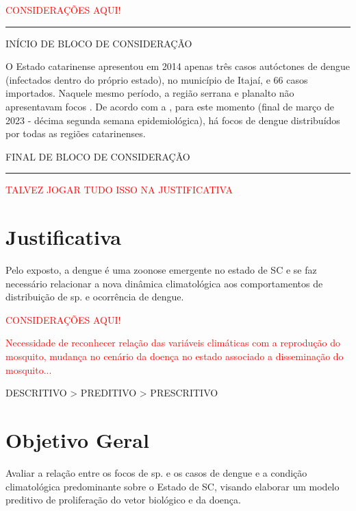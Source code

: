 \newpage

\begin{center}
\textcolor{red}{CONSIDERAÇÕES AQUI!}
\end{center}

{\color{red} \rule{\linewidth}{0.5mm}}

\color{red} INÍCIO DE BLOCO DE CONSIDERAÇÃO

\indent O Estado catarinense apresentou em 2014 apenas três casos autóctones de dengue (infectados dentro do próprio estado), no município de Itajaí, e 66 casos importados. Naquele mesmo período, a região serrana e planalto não apresentavam focos \cite{Matiola2020Dissertação}. De acordo com a , para este momento (final de março de 2023 - décima segunda semana epidemiológica), há focos de dengue distribuídos por todas as regiões catarinenses.

FINAL DE BLOCO DE CONSIDERAÇÃO

{\color{red} \rule{\linewidth}{0.5mm}}

\color{black}


\textcolor{red}{TALVEZ JOGAR TUDO ISSO NA JUSTIFICATIVA}



\newpage
\section{Justificativa}
\indent Pelo exposto, a dengue é uma zoonose emergente no estado de \acrlong{SC} e se faz necessário relacionar a nova dinâmica climatológica aos comportamentos de distribuição de  sp. e ocorrência de dengue.

\begin{center}
\textcolor{red}{CONSIDERAÇÕES AQUI!}
\end{center}
\textcolor{red}{Necessidade de reconhecer relação das variáveis climáticas com a reprodução do mosquito, mudança no cenário da doença no estado associado a disseminação do mosquito...}

\indent DESCRITIVO > PREDITIVO > PRESCRITIVO
 
 \section{Objetivo Geral}
 Avaliar a relação entre os focos de  sp. e os casos de dengue e a condição climatológica predominante sobre o Estado de \acrlong{SC}, visando elaborar um modelo preditivo de proliferação do vetor biológico e da doença.

